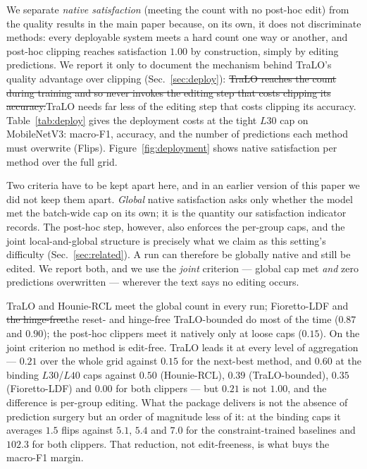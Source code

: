 \documentclass[10pt]{article}
\newcommand{\del}[1]{{\color{red}\sout{#1}}}
\begin{document}
We separate \emph{native satisfaction} (meeting the count with no
post-hoc edit) from the quality results in the main paper because, on
its own, it does not discriminate methods: every deployable system meets
a hard count one way or another, and post-hoc clipping reaches
satisfaction $1.00$ by construction, simply by editing predictions. We
report it only to document the mechanism behind TraLO's quality
advantage over clipping (Sec.~\ref{sec:deploy}): \del{TraLO reaches the
count during training and so never invokes the editing step that costs
clipping its accuracy.}{\color{blue}TraLO needs far less of the editing
step that costs clipping its accuracy.} Table~\ref{tab:deploy} gives the deployment costs
at the tight $L30$ cap on MobileNetV3: macro-F1, accuracy, and the
number of predictions each method must overwrite (Flips).
Figure~\ref{fig:deployment} shows native satisfaction per method over
the full grid.

{\color{blue}Two criteria have to be kept apart here, and in an earlier version of
this paper we did not keep them apart. \emph{Global} native satisfaction asks
only whether the model met the batch-wide cap on its own; it is the quantity our
satisfaction indicator records. The post-hoc step, however, also enforces the
per-group caps, and the joint local-and-global structure is precisely what we
claim as this setting's difficulty (Sec.~\ref{sec:related}). A run can therefore
be globally native and still be edited. We report both, and we use the
\emph{joint} criterion --- global cap met \emph{and} zero predictions
overwritten --- wherever the text says no editing occurs.}

TraLO and Hounie-RCL meet the {\color{blue}global} count in every run;
Fioretto-LDF and \del{the hinge-free}{\color{blue}the reset- and hinge-free}
TraLO-bounded do most of the time ($0.87$ and $0.90$); the
post-hoc clippers meet it natively only at loose caps
{\color{blue}($0.15$)}.
{\color{blue}On the joint criterion no method is edit-free. TraLO leads it at
every level of aggregation --- $0.21$ over the whole grid against $0.15$ for the
next-best method, and $0.60$ at the binding $L30$/$L40$ caps against $0.50$
(Hounie-RCL), $0.39$ (TraLO-bounded), $0.35$ (Fioretto-LDF) and $0.00$ for both
clippers --- but $0.21$ is not $1.00$, and the difference is per-group editing.
What the package delivers is not the absence of prediction surgery but an order
of magnitude less of it: at the binding caps it averages $1.5$ flips against
$5.1$, $5.4$ and $7.0$ for the constraint-trained baselines and $102.3$ for both
clippers. That reduction, not edit-freeness, is what buys the macro-F1 margin.}
\end{document}
